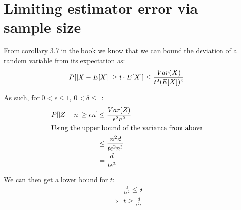 \documentclass[a4paper]{scrreprt}
\DeclarePairedDelimiter\abs{\lvert}{\rvert}
\begin{document}
\section{Limiting estimator error via sample size}

From corollary 3.7 in the book we know that we can bound the deviation of a
random variable from its expectation as:
\[
	P[\abs{X - E[X]} \geq t \cdot E[X]] \leq \frac{Var(X)}{t^2 (E[X])^2}
\]

As such, for $0 < \epsilon \leq 1$, $0 < \delta \leq 1$:
\begin{align*}
	P[\abs{Z - n} \geq \epsilon n] & \leq \frac{Var(Z)}{\epsilon^2 n^2} \\
	\intertext{Using the upper bound of the variance from above}
	& \leq \frac{n^2 d}{t \epsilon^2 n^2} \\
	& = \frac{d}{t \epsilon^2}
\end{align*}

We can then get a lower bound for $t$:
\begin{align*}
	& \frac{d}{t \epsilon^2} \leq \delta \\
	\Rightarrow & t \geq \frac{d}{\epsilon^2 \delta}
\end{align*}
\end{document}
